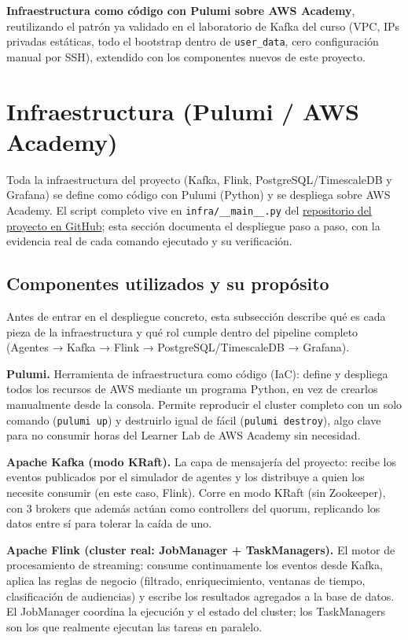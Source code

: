 \textbf{Infraestructura como código con Pulumi sobre AWS Academy}, reutilizando el patrón ya validado en el laboratorio de Kafka del curso (VPC, IPs privadas estáticas, todo el bootstrap dentro de \texttt{user\_data}, cero configuración manual por SSH), extendido con los componentes nuevos de este proyecto.

\clearpage
\section{Infraestructura (Pulumi / AWS Academy)}
\label{sec:infraestructura}

Toda la infraestructura del proyecto (Kafka, Flink, PostgreSQL/TimescaleDB y Grafana) se define como código con Pulumi (Python) y se despliega sobre AWS Academy. El script completo vive en \texttt{infra/\_\_main\_\_.py} del \href{https://github.com/Noodle96/Big_Data/tree/main/digital-audience-streaming-platform}{repositorio del proyecto en GitHub}; esta sección documenta el despliegue paso a paso, con la evidencia real de cada comando ejecutado y su verificación.

\subsection{Componentes utilizados y su propósito}

Antes de entrar en el despliegue concreto, esta subsección describe qué es cada pieza de la infraestructura y qué rol cumple dentro del pipeline completo (Agentes → Kafka → Flink → PostgreSQL/TimescaleDB → Grafana).

\textbf{Pulumi.} Herramienta de infraestructura como código (IaC): define y despliega todos los recursos de AWS mediante un programa Python, en vez de crearlos manualmente desde la consola. Permite reproducir el cluster completo con un solo comando (\texttt{pulumi up}) y destruirlo igual de fácil (\texttt{pulumi destroy}), algo clave para no consumir horas del Learner Lab de AWS Academy sin necesidad.

\textbf{Apache Kafka (modo KRaft).} La capa de mensajería del proyecto: recibe los eventos publicados por el simulador de agentes y los distribuye a quien los necesite consumir (en este caso, Flink). Corre en modo KRaft (sin Zookeeper), con 3 brokers que además actúan como controllers del quorum, replicando los datos entre sí para tolerar la caída de uno.

\textbf{Apache Flink (cluster real: JobManager + TaskManagers).} El motor de procesamiento de streaming: consume continuamente los eventos desde Kafka, aplica las reglas de negocio (filtrado, enriquecimiento, ventanas de tiempo, clasificación de audiencias) y escribe los resultados agregados a la base de datos. El JobManager coordina la ejecución y el estado del cluster; los TaskManagers son los que realmente ejecutan las tareas en paralelo.

